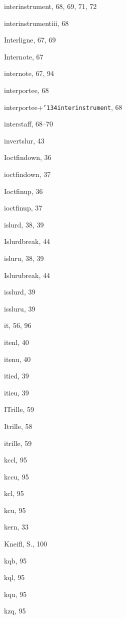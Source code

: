 \begin{theindex}
  \item {\Bslash interinstrument}, 68, 69, 71, 72
  \item {\Bslash interinstrumentiii}, 68
  \item {\Bslash Interligne}, 67, 69
  \item {\Bslash Internote}, 67
  \item {\Bslash internote}, 67, 94
  \item {\Bslash interportee}, 68
  \item {\Bslash interportee+\tt  \char '134interinstrument}, 68
  \item {\Bslash interstaff}, 68--70
  \item {\Bslash invertslur}, 43
  \item {\Bslash Ioctfindown}, 36
  \item {\Bslash ioctfindown}, 37
  \item {\Bslash Ioctfinup}, 36
  \item {\Bslash ioctfinup}, 37
  \item {\Bslash islurd}, 38, 39
  \item {\Bslash Islurdbreak}, 44
  \item {\Bslash isluru}, 38, 39
  \item {\Bslash Islurubreak}, 44
  \item {\Bslash isslurd}, 39
  \item {\Bslash issluru}, 39
  \item {\Bslash it}, 56, 96
  \item {\Bslash itenl}, 40
  \item {\Bslash itenu}, 40
  \item {\Bslash itied}, 39
  \item {\Bslash itieu}, 39
  \item {\Bslash ITrille}, 59
  \item {\Bslash Itrille}, 58
  \item {\Bslash itrille}, 59

  \indexspace

  \item {\Bslash kccl}, 95
  \item {\Bslash kccu}, 95
  \item {\Bslash kcl}, 95
  \item {\Bslash kcu}, 95
  \item {\Bslash kern}, 33
  \item {\sc Kneifl, S.}, 100
  \item {\Bslash kqb}, 95
  \item {\Bslash kql}, 95
  \item {\Bslash kqu}, 95
  \item {\Bslash kzq}, 95


\end{theindex}
